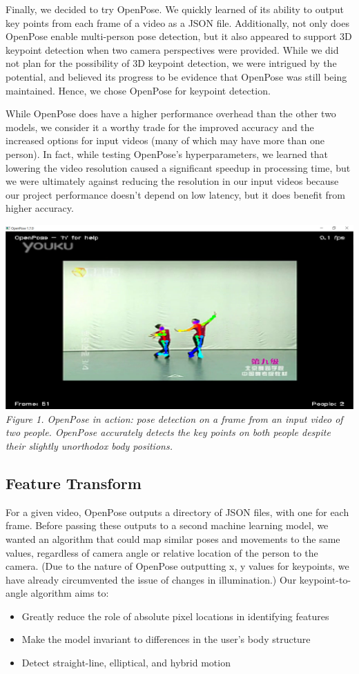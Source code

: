\indent Finally, we decided to try OpenPose. We quickly learned of its ability to output key points from each frame of a 
video as a JSON file. Additionally, not only does OpenPose enable multi-person pose detection, but it also appeared 
to support 3D keypoint detection when two camera perspectives were provided. While we did not plan for the possibility 
of 3D keypoint detection, we were intrigued by the potential, and believed its progress to be evidence that OpenPose 
was still being maintained. Hence, we chose OpenPose for keypoint detection.
	
\indent While OpenPose does have a higher performance overhead than the other two models, we consider it a worthy trade for the 
improved accuracy and the increased options for input videos (many of which may have more than one person). In fact, while 
testing OpenPose’s hyperparameters, we learned that lowering the video resolution caused a significant speedup in 
processing time, but we were ultimately against reducing the resolution in our input videos because our project 
performance doesn’t depend on low latency, but it does benefit from higher accuracy.

\includegraphics[width=\columnwidth]{sec/openpose_demo}
\textit{Figure 1. OpenPose in action: pose detection on a frame from an input video of two people. 
OpenPose accurately detects the key points on both people despite their slightly unorthodox body positions.}

\subsection{Feature Transform}
\indent For a given video, OpenPose outputs a directory of JSON files, with one for each frame. Before passing these outputs to a 
second machine learning model, we wanted an algorithm that could map similar poses and movements to the same values, 
regardless of camera angle or relative location of the person to the camera. (Due to the nature of OpenPose outputting x, 
y values for keypoints, we have already circumvented the issue of changes in illumination.)  Our keypoint-to-angle algorithm 
aims to:
\begin{itemize}
    \item Greatly reduce the role of absolute pixel locations in identifying features
    \item Make the model invariant to differences in the user’s body structure
    \item Detect straight-line, elliptical, and hybrid motion
\end{itemize}

